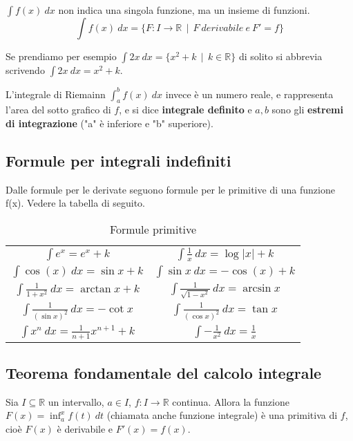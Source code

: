 \begin{observation}
$\int f(x)\:dx$ non indica una singola funzione, ma un insieme di funzioni.
\[\int f(x)\:dx = \{F: I \to \mathbb{R} \:\: | \:\: F \: derivabile \: e \: F'=f\}\]
\end{observation}

\begin{example}
Se prendiamo per esempio $\int 2x\:dx = \{x^2 + k \:\:|\:\: k \in \mathbb{R}\}$ di solito si abbrevia scrivendo $\int 2x\:dx = x^2 + k$. 
\end{example}

\hspace{-15pt}L'integrale di Riemainn $\int_a^b f(x)\:dx$ invece è un numero reale, e rappresenta l'area del sotto grafico di $f$, e si dice \textbf{integrale definito} e $a,b$ sono gli \textbf{estremi di integrazione} ("a" è inferiore e "b" superiore). 

\newpage
\subsection{Formule per integrali indefiniti}
Dalle formule per le derivate seguono formule per le primitive di una funzione f(x). Vedere la tabella di seguito.
\begin{table}[h!]
    \centering
    \setlength{\tabcolsep}{6pt}
    \renewcommand{\arraystretch}{1.5}
    \begin{tabular}{|c||c|}
        \hline
        $\int e^x=e^x + k$ & $\int \frac{1}{x}\:dx=\log|x| + k$\\
        
        $\int \cos(x)\:dx=\sin{x} + k$ & $\int \sin{x}\:dx=-\cos(x) + k$ \\
        
        $\int \frac{1}{1+x^2}\:dx=\arctan{x} + k$ & $\int \frac{1}{\sqrt{1 - x^2}}\:dx=\arcsin{x}$\\
        
        $\int \frac{1}{(\sin{x})^2}\:dx=-\cot{x}$ & $\int \frac{1}{(\cos{x})^2}\:dx=\tan{x}$ \\
        
        $\int x^n \:dx=\frac{1}{n+1}x^{n+1} + k$ & $\int -\frac{1}{x^2}\:dx=\frac{1}{x}$\\
        \hline
    \end{tabular}
    \caption{Formule primitive}
\end{table}
\vspace{-10pt}
\subsection{Teorema fondamentale del calcolo integrale}
\begin{theorem}
Sia $I \subseteq \mathbb{R}$ un intervallo, $a \in I$, $f: I \to \mathbb{R}$ continua. Allora la funzione $F(x) = \inf_a^x f(t) \:dt$ (chiamata anche funzione integrale) è una primitiva di $f$, cioè $F(x)$ è derivabile e $F'(x) = f(x)$.
\end{theorem}

